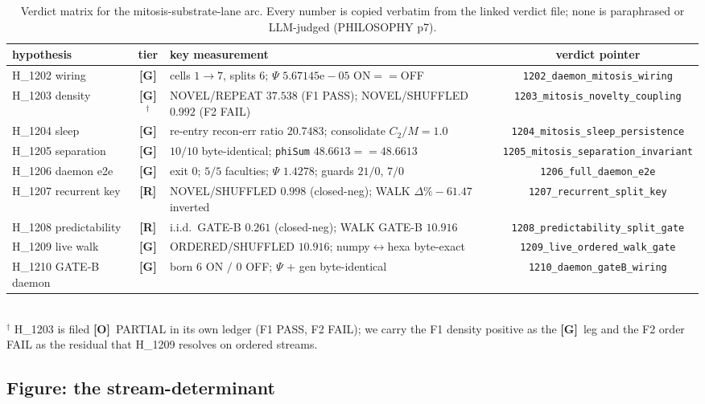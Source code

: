 \documentclass[11pt,a4paper]{article}
\providecommand{\tierGreen}{\textbf{[G]}}
\providecommand{\tierOrange}{\textbf{[O]}}
\providecommand{\tierRed}{\textbf{[R]}}
\newcommand{\recon}{\mathrm{recon\text{-}err}}
\begin{document}
\begin{table}[t]
\centering
\caption{Verdict matrix for the mitosis-substrate-lane arc. Every number is
copied verbatim from the linked verdict file; none is paraphrased or
LLM-judged (PHILOSOPHY p7).}
\label{tab:matrix}
\small
\begin{tabular}{p{} c p{} c}
\toprule
hypothesis & tier & key measurement & verdict pointer \\
\midrule
H\_1202 wiring & \tierGreen & cells $1\to7$, splits $6$; $\Psi$ $5.67145\mathrm{e}{-}05$ ON$==$OFF & \texttt{1202\_daemon\_mitosis\_wiring} \\
H\_1203 density & \tierGreen$^\dagger$ & NOVEL/REPEAT $37.538$ (F1 PASS); NOVEL/SHUFFLED $0.992$ (F2 FAIL) & \texttt{1203\_mitosis\_novelty\_coupling} \\
H\_1204 sleep & \tierGreen & re-entry $\recon$ ratio $20.7483$; consolidate $C_2/M=1.0$ & \texttt{1204\_mitosis\_sleep\_persistence} \\
H\_1205 separation & \tierGreen & $10/10$ byte-identical; \texttt{phiSum} $48.6613==48.6613$ & \texttt{1205\_mitosis\_separation\_invariant} \\
H\_1206 daemon e2e & \tierGreen & exit $0$; $5/5$ faculties; $\Psi$ $1.4278$; guards $21/0$, $7/0$ & \texttt{1206\_full\_daemon\_e2e} \\
H\_1207 recurrent key & \tierRed & NOVEL/SHUFFLED $0.998$ (closed-neg); WALK $\Delta\% -61.47$ inverted & \texttt{1207\_recurrent\_split\_key} \\
H\_1208 predictability & \tierRed & i.i.d.\ GATE-B $0.261$ (closed-neg); WALK GATE-B $10.916$ & \texttt{1208\_predictability\_split\_gate} \\
H\_1209 live walk & \tierGreen & ORDERED/SHUFFLED $10.916$; numpy$\leftrightarrow$hexa byte-exact & \texttt{1209\_live\_ordered\_walk\_gate} \\
H\_1210 GATE-B daemon & \tierGreen & born $6$ ON $/$ $0$ OFF; $\Psi$ $+$ gen byte-identical & \texttt{1210\_daemon\_gateB\_wiring} \\
\bottomrule
\end{tabular}
\\[2pt]
{\footnotesize $^\dagger$ H\_1203 is filed \tierOrange\ PARTIAL in its own ledger
(F1 PASS, F2 FAIL); we carry the F1 density positive as the \tierGreen\ leg and
the F2 order FAIL as the residual that H\_1209 resolves on ordered streams.}
\end{table}

\subsection{Figure: the stream-determinant}
\end{document}
